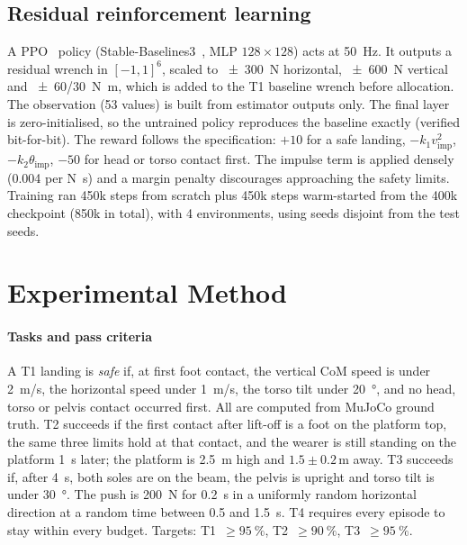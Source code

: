 \documentclass[conference]{IEEEtran}
\begin{document}
\subsection{Residual reinforcement learning}
A PPO~\cite{schulman2017ppo} policy (Stable-Baselines3~\cite{raffin2021sb3}, MLP $128\times128$) acts at \SI{50}{Hz}. It outputs a residual wrench in $[-1,1]^6$, scaled to \SI{\pm300}{N} horizontal, \SI{\pm600}{N} vertical and \SI{\pm60}{}/\SI{30}{N.m}, which is added to the T1 baseline wrench before allocation. The observation (53 values) is built from estimator outputs only. The final layer is zero-initialised, so the untrained policy reproduces the baseline exactly (verified bit-for-bit). The reward follows the specification: $+10$ for a safe landing, $-k_1 v_{\text{imp}}^2$, $-k_2\theta_{\text{imp}}$, $-50$ for head or torso contact first. The impulse term is applied densely (\SI{0.004}{} per \si{N.s}) and a margin penalty discourages approaching the safety limits. Training ran 450k steps from scratch plus 450k steps warm-started from the 400k checkpoint (850k in total), with 4 environments, using seeds disjoint from the test seeds.

\section{Experimental Method}
\label{sec:method}
\paragraph*{Tasks and pass criteria} A T1 landing is \emph{safe} if, at first foot contact, the vertical CoM speed is under \SI{2}{m/s}, the horizontal speed under \SI{1}{m/s}, the torso tilt under \SI{20}{\degree}, and no head, torso or pelvis contact occurred first. All are computed from MuJoCo ground truth. T2 succeeds if the first contact after lift-off is a foot on the platform top, the same three limits hold at that contact, and the wearer is still standing on the platform \SI{1}{s} later; the platform is \SI{2.5}{m} high and $1.5\pm0.2$\,m away. T3 succeeds if, after \SI{4}{s}, both soles are on the beam, the pelvis is upright and torso tilt is under \SI{30}{\degree}. The push is \SI{200}{N} for \SI{0.2}{s} in a uniformly random horizontal direction at a random time between 0.5 and \SI{1.5}{s}. T4 requires every episode to stay within every budget. Targets: T1~$\ge\SI{95}{\%}$, T2~$\ge\SI{90}{\%}$, T3~$\ge\SI{95}{\%}$.
\end{document}
